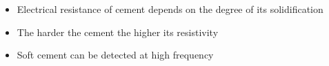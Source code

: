 \documentclass[aspectratio=169]{beamer}
\begin{document}
\begin{frame}
\begin{small}
\begin{itemize}
\item Electrical resistance of cement depends on the degree of its solidification
\item The harder the cement the higher its resistivity
\item Soft cement can be detected at high frequency

\end{itemize}
\end{small}



\end{frame}
\end{document}
